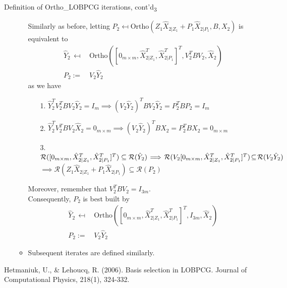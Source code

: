 \documentclass[t,usepdftitle=false]{beamer}
\begin{document}
\begin{frame}{Definition of Ortho\_LOBPCG iterations, cont'd\textsubscript{3}}
	\begin{itemize}
	\item[]
	\begin{itemize}
	\item[]
	Similarly as before, letting $P_2\mapsfrom\text{Ortho}(Z_1\hat{X}_{2|Z_1}+P_1\hat{X}_{2|P_1},B,X_2)$ is equivalent to
	\begin{align*}
		\hat{Y}_2\,\mapsfrom&\,\text{Ortho}([0_{m\times m},\hat{X}_{2|Z_1}^T,\hat{X}_{2|P_1}^T]^T,V_2^TBV_2,\hat{X}_2)\\
		P_2:=&\,V_2\hat{Y}_2
	\end{align*}
	as we have\medskip	
	\begin{enumerate}
	\item[1.]$\hat{Y}_2^TV_2^TBV_2\hat{Y}_2=I_{m}
	\implies
	(V_2\hat{Y}_2)^TBV_2\hat{Y}_2=
	P_2^TBP_2=I_{m}$\smallskip
	\item[2.]$\hat{Y}_2^TV_2^TBV_2\hat{X}_2=0_{m\times m}
	\implies
	(V_2\hat{Y}_2)^TBX_2=
	P_2^TBX_2=0_{m\times m}$\smallskip
	\item[3.] $\mathcal{R}([0_{m\times m},\hat{X}_{2|Z_1}^T,\hat{X}_{2|P_1}^T]^T)\subseteq\mathcal{R}(\hat{Y}_2)
	\!\implies\!
	\mathcal{R}(V_2[0_{m\times m},\hat{X}_{2|Z_1}^T,\hat{X}_{2|P_1}^T]^T)\!\subseteq\!\mathcal{R}(V_2\hat{Y}_2)\hspace{-1cm}$\\
	\hspace{4.98cm}$\implies
	\mathcal{R}(Z_1\hat{X}_{2|Z_1}+P_1\hat{X}_{2|P_1})\subseteq\mathcal{R}(P_2)$
	\end{enumerate}\medskip
	Moreover, remember that $V_2^TBV_2=I_{3m}$.\\
	Consequently, $P_2$ is best built by
	\begin{align*}
	\hat{Y}_2\,\mapsfrom&\,\text{Ortho}([0_{m\times m},\hat{X}_{2|Z_1}^T,\hat{X}_{2|P_1}^T]^T,I_{3m},\hat{X}_2)\\
	P_2:=&\,V_2\hat{Y}_2
	\end{align*}
	\item Subsequent iterates are defined similarly.
	\end{itemize}
	\end{itemize}
	\medskip
	\tiny{Hetmaniuk, U., \& Lehoucq, R. (2006). Basis selection in LOBPCG. Journal of Computational Physics, 218(1), 324-332.}
\end{frame}
\end{document}
